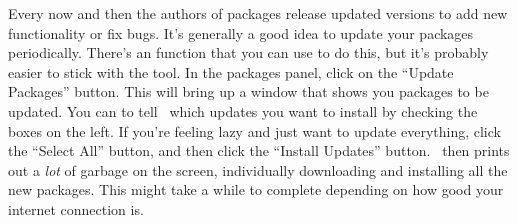 Every now and then the authors of packages release updated versions to add new functionality or fix bugs. It's generally a good idea to update your packages periodically. There's an  function that you can use to do this, but it's probably easier to stick with the \Rstudio tool. In the packages panel, click on the ``Update Packages'' button. This will bring up a window that shows you packages to be updated. You can to tell \R\ which updates you want to install by checking the boxes on the left. If you're feeling lazy and just want to update everything, click the ``Select All'' button, and then click the ``Install Updates'' button. \R\ then prints out a {\it lot} of garbage on the screen, individually downloading and installing all the new packages. This might take a while to complete depending on how good your internet connection is.  




